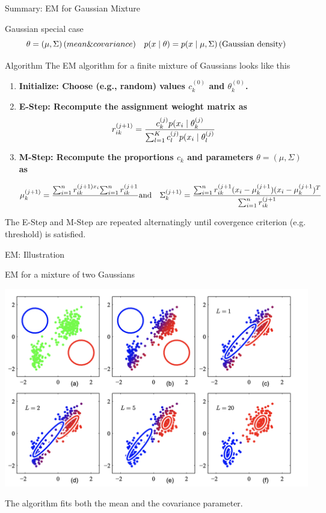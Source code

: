 \documentclass[10pt]{beamer}
\newcommand{\sumn}{\sum_{i=1}^{n}}
\newcommand{\soft}{r} %
\begin{document}
\begin{frame}{Summary: EM for Gaussian Mixture}
\footnotesize
\begin{sblock}{Gaussian special case}
\[  \theta = (\mu, \Sigma) \, \text(mean \& covariance) \quad p(x \; | \; \theta) = p(x \; | \; \mu, \Sigma) \, \text{(Gaussian density)}\]
\end{sblock}
\begin{sblock}{Algorithm}
The EM algorithm for a finite mixture of Gaussians looks like this
\begin{enumerate}
\item \bf{Initialize:} Choose (e.g., random) values $c_k^{(0)}$ and $\theta_k^{(0)}$.
\item \bf{E-Step:} Recompute the assignment weioght matrix as
\[ \soft_{ik}^{(j+1)} = \df{c_k^{(j)} p(x_i \cond \theta_k^{(j)}}{ \sum_{l=1}^K c_l^{(j)} p(x_i \cond \theta_l^{(j)}}\]
\item \bf{M-Step:} Recompute the proportions $c_k$ and parameters  $\theta=(\mu, \Sigma)$ as


\[ \mu_k^{(j+1)} = \df{\sumn \soft_{ik}^{(j+1) x_i}{ \sumn \soft_{ik}^{(j+1}}} \quad \text{and} \quad \Sigma_k^{(j+1)}= \df{ \sumn \soft_{ik}^{(j+1}   (x_i  -\mu_k^{(j+1})  (x_i  -\mu_k^{(j+1})^T}{ \sumn \soft_{ik}^{(j+1}}   \] 
\end{enumerate}
The E-Step and M-Step are repeated alternatingly until covergence criterion (e.g. threshold) is satisfied.
\end{sblock}
\end{frame}

\begin{frame}{EM: Illustration}

\begin{sblock}{EM for a mixture of two Gaussians}
\begin{center}
\includegraphics[width=.6\textwidth]{images/em_for_mixture_of_two_gaussians}
\end{center}

\end{sblock}

The algorithm fits both the mean and the covariance parameter.
\end{frame}
\end{document}
